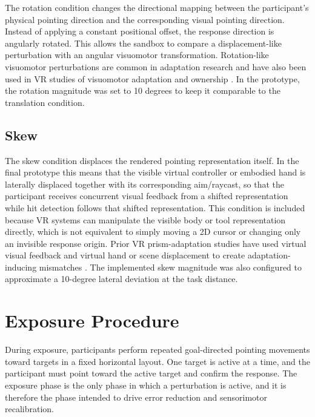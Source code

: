 The rotation condition changes the directional mapping between the participant's physical pointing direction and the corresponding visual pointing direction. Instead of applying a constant positional offset, the response direction is angularly rotated. This allows the sandbox to compare a displacement-like perturbation with an angular visuomotor transformation. Rotation-like visuomotor perturbations are common in adaptation research and have also been used in VR studies of visuomotor adaptation and ownership \cite{gerken2025sense}. In the prototype, the rotation magnitude was set to 10 degrees to keep it comparable to the translation condition.

\subsection{Skew}
\label{subsec:method-skew}

The skew condition displaces the rendered pointing representation itself. In the final prototype this means that the visible virtual controller or embodied hand is laterally displaced together with its corresponding aim/raycast, so that the participant receives concurrent visual feedback from a shifted representation while hit detection follows that shifted representation. This condition is included because VR systems can manipulate the visible body or tool representation directly, which is not equivalent to simply moving a 2D cursor or changing only an invisible response origin. Prior VR prism-adaptation studies have used virtual visual feedback and virtual hand or scene displacement to create adaptation-inducing mismatches \cite{kim2017development,Ramos2019,anan2025comparative}. The implemented skew magnitude was also configured to approximate a 10-degree lateral deviation at the task distance.

\section{Exposure Procedure}
\label{sec:method-exposure}

During exposure, participants perform repeated goal-directed pointing movements toward targets in a fixed horizontal layout. One target is active at a time, and the participant must point toward the active target and confirm the response. The exposure phase is the only phase in which a perturbation is active, and it is therefore the phase intended to drive error reduction and sensorimotor recalibration.

